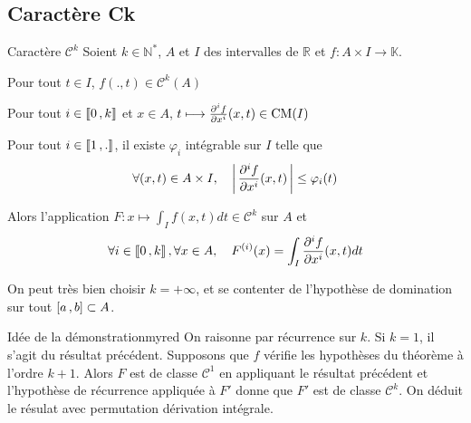     \subsection{Caractère Ck}

    \begin{theo}{Caractère $\mathcal{C}^k$}{}
        Soient $k \in \mathbb{N}^*$, $A$ et $I$ des intervalles de $\mathbb{R}$ et $f : A \times I \to \mathbb{K}$. 
        \begin{suppose}
            \item Pour tout $t \in I$, $f(.,t) \in \mathcal{C}^k(A)$
            \item Pour tout $i \in \left\llbracket 0 \, , k \right\rrbracket$ et $x \in A$, $t \longmapsto \frac{\partial^i f}{\partial x^i}(x,t) \in \operatorname{CM}(I)$
            \item Pour tout $i \in \left\llbracket 1 \, , . \right\rrbracket$, il existe $\varphi_i$ intégrable sur $I$ telle que 
            \[ \forall (x,t) \in A \times I, \quad \left\lvert \,\frac{\partial^i f}{\partial x^i}(x,t) \, \right\rvert \leq \varphi_i(t) \]
        \end{suppose}
        Alors l’application $F : x \mapsto \int_I f(x,t)dt \in \mathcal{C}^k$ sur $A$ et 
        \[ \forall i \in \left\llbracket 0 \, , k \right\rrbracket, \forall x \in A, \quad F^{(i)}(x) = \int_I \frac{\partial^i f}{\partial x^i}(x,t)dt \]   
    \end{theo}

    On peut très bien choisir $k = +\infty$, et se contenter de l’hypothèse de domination sur tout $\left[ a \, , b \right] \subset A$.    

    \begin{demo}{Idée de la démonstration}{myred}
        On raisonne par récurrence sur $k$. Si $k = 1$, il s’agit du résultat précédent. Supposons que $f$ vérifie les hypothèses du théorème à l’ordre $k+1$. Alors $F$ est de classe $\mathcal{C}^1$ en appliquant le résultat précédent et l’hypothèse de récurrence appliquée à $F'$ donne que $F'$ est de classe $\mathcal{C}^k$. On déduit le résulat avec permutation dérivation intégrale.
    \end{demo}

